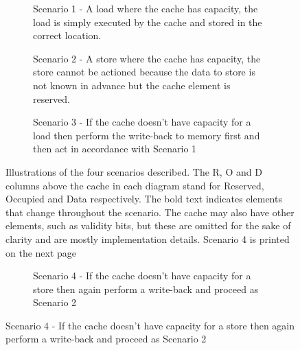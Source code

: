 \begin{figure}[htbp]
	\begin{center}
		\begin{subfigure}[b]{\textwidth}
			\begin{center}
				
				\caption{Scenario 1 - A load where the cache has capacity, the load is simply executed by the cache and stored in the correct location.}
			\end{center}
		\end{subfigure}
		\begin{subfigure}[b]{\textwidth}
			\begin{center}
				
				\caption{Scenario 2 - A store where the cache has capacity, the store cannot be actioned because the data to store is not known in advance but the cache element is reserved.}
			\end{center}
		\end{subfigure}
		\begin{subfigure}[b]{\textwidth}
			\begin{center}
				
				\caption{Scenario 3 - If the cache doesn't have capacity for a load then perform the write-back to memory first and then act in accordance with Scenario 1}
			\end{center}
		\end{subfigure}
	\caption[Illustration of Pre-emptive Scenarios]{Illustrations of the four scenarios described. The R, O and D columns above the cache in each diagram stand for Reserved, Occupied and Data respectively. The bold text indicates elements that change throughout the scenario. The cache may also have other elements, such as validity bits, but these are omitted for the sake of clarity and are mostly implementation details. Scenario 4 is printed on the next page}
	\label{fig:scenarios}
	\end{center}
\end{figure}
\begin{figure}\ContinuedFloat
	\begin{center}
    	\begin{subfigure}[b]{\textwidth}
    		\begin{center}
    			
    			\caption{Scenario 4 - If the cache doesn't have capacity for a store then again perform a write-back and proceed as Scenario 2}
    		\end{center}
    	\end{subfigure}
	\end{center}
\end{figure}

